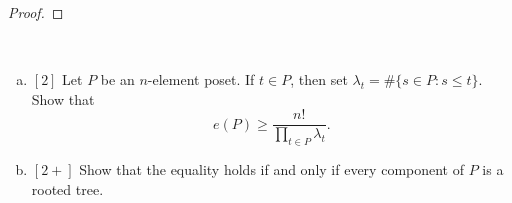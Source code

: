 \documentclass{article}
\newenvironment{problem}[2][Problem]{\begin{trivlist}
\item[\hskip \labelsep {\bfseries #1}\hskip \labelsep {\bfseries #2.}]}{\end{trivlist}}
\begin{document}
\begin{proof}
\end{proof}
\pagebreak
\begin{problem}{57} ~
  \begin{enumerate}[a.]
    \item $[2]$ Let $P$ be an $n$-element poset. If $t \in P$, then set
    $\lambda_t = \#\{s \in P : s \leq t\}$.
    Show that \[
      e(P) \geq \frac{n!}{ \prod_{t \in P} \lambda_t}.
    \]
    \item $[2+]$ Show that the equality holds if and only if every component of $P$ is
    a rooted tree.
  \end{enumerate}
\end{problem}
\end{document}
